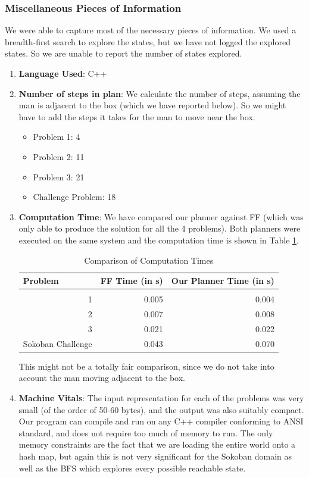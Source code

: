 \documentclass[10pt, letter]{article}
\begin{document}
\subsubsection*{Miscellaneous Pieces of Information}
We were able to capture most of the necessary pieces of information. We used a breadth-first search to explore the states, but we have not logged the explored states. So we are unable to report the number of states explored.
\begin{enumerate}
\item \textbf{Language Used}: C++
\item \textbf{Number of steps in plan}: We calculate the number of steps, assuming the man is adjacent to the box (which we have reported below). So we might have to add the steps it takes for the man to move near the box.
\begin{itemize}
\item Problem 1: 4
\item Problem 2: 11
\item Problem 3: 21
\item Challenge Problem: 18
\end{itemize}
\item \textbf{Computation Time}: We have compared our planner against FF (which was only able to produce the solution for all the 4 problems). Both planners were executed on the same system and the computation time is shown in Table \ref{tab1}.

\begin{table}[htbp]
\caption{Comparison of Computation Times}
\centering
\begin{tabular}{|r|r|r|}
\hline
\multicolumn{1}{|l|}{Problem} & \multicolumn{1}{l|}{FF Time (in s)} & \multicolumn{1}{l|}{Our Planner Time (in s)} \\ \hline
\multicolumn{1}{|l|}{} & \multicolumn{1}{l|}{} & \multicolumn{1}{l|}{} \\ \hline
1 & 0.005 & 0.004 \\ \hline
2 & 0.007 & 0.008 \\ \hline
3 & 0.021 & 0.022 \\ \hline
Sokoban Challenge & 0.043 & 0.070 \\ \hline
\end{tabular}
\label{tab1}
\end{table}
This might not be a totally fair comparison, since we do not take into account the man moving adjacent to the box.
\item \textbf{Machine Vitals}: The input representation for each of the problems was very small (of the order of 50-60 bytes), and the output was also suitably compact. Our program can compile and run on any C++ compiler conforming to ANSI standard, and does not require too much of memory to run. The only memory constraints are the fact that we are loading the entire world onto a hash map, but again this is not very significant for the Sokoban domain as well as the BFS which explores every possible reachable state.
\end{enumerate}
\end{document}
